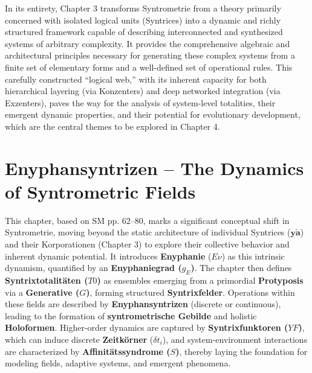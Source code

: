 \documentclass[12pt]{article}
\newcommand{\q}[1]{\enquote{#1}}
\newcommand{\syntrix}{\bm{y\widetilde{a}}}
\newcommand{\enyphaniegrad}{g_E}
\newcommand{\syntrixtotalitaet}{T0}
\newcommand{\generative}{G}
\newcommand{\syntrixfunktor}{YF}
\newcommand{\affinitaetssyndrom}{S}
\newcommand{\zeitkorn}{\delta t_i}
\begin{document}
In its entirety, Chapter 3 transforms Syntrometrie from a theory primarily concerned with isolated logical units (Syntrices) into a dynamic and richly structured framework capable of describing interconnected and synthesized systems of arbitrary complexity. It provides the comprehensive algebraic and architectural principles necessary for generating these complex systems from a finite set of elementary forms and a well-defined set of operational rules. This carefully constructed \q{logical web,} with its inherent capacity for both hierarchical layering (via Konzenters) and deep networked integration (via Exzenters), paves the way for the analysis of system-level totalities, their emergent dynamic properties, and their potential for evolutionary development, which are the central themes to be explored in Chapter 4.

\clearpage

\section{Enyphansyntrizen – The Dynamics of Syntrometric Fields}
\label{sec:chapter4}

This chapter, based on SM pp. 62–80, marks a significant conceptual shift in Syntrometrie, moving beyond the static architecture of individual Syntrices (\(\syntrix\)) and their Korporationen (Chapter 3) to explore their collective behavior and inherent dynamic potential. It introduces \textbf{Enyphanie} (\(E\nu\)) as this intrinsic dynamism, quantified by an \textbf{Enyphaniegrad (\(\enyphaniegrad\))}. The chapter then defines \textbf{Syntrixtotalitäten (\(\syntrixtotalitaet\))} as ensembles emerging from a primordial \textbf{Protyposis} via a \textbf{Generative (\(\generative\))}, forming structured \textbf{Syntrixfelder}. Operations within these fields are described by \textbf{Enyphansyntrizen} (discrete or continuous), leading to the formation of \textbf{syntrometrische Gebilde} and holistic \textbf{Holoformen}. Higher-order dynamics are captured by \textbf{Syntrixfunktoren (\(\syntrixfunktor\))}, which can induce discrete \textbf{Zeitkörner} (\(\zeitkorn\)), and system-environment interactions are characterized by \textbf{Affinitätssyndrome (\(\affinitaetssyndrom\))}, thereby laying the foundation for modeling fields, adaptive systems, and emergent phenomena.
\end{document}
